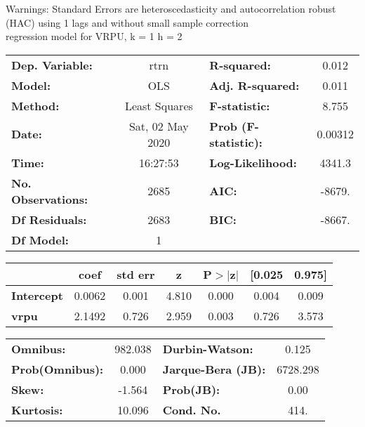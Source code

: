 Warnings: \newline
 [1] Standard Errors are heteroscedasticity and autocorrelation robust (HAC) using 1 lags and without small sample correction\\ 

regression model for VRPU, k = 1 h = 2\begin{center}
\begin{tabular}{lclc}
\toprule
\textbf{Dep. Variable:}    &       rtrn       & \textbf{  R-squared:         } &     0.012   \\
\textbf{Model:}            &       OLS        & \textbf{  Adj. R-squared:    } &     0.011   \\
\textbf{Method:}           &  Least Squares   & \textbf{  F-statistic:       } &     8.755   \\
\textbf{Date:}             & Sat, 02 May 2020 & \textbf{  Prob (F-statistic):} &  0.00312    \\
\textbf{Time:}             &     16:27:53     & \textbf{  Log-Likelihood:    } &    4341.3   \\
\textbf{No. Observations:} &        2685      & \textbf{  AIC:               } &    -8679.   \\
\textbf{Df Residuals:}     &        2683      & \textbf{  BIC:               } &    -8667.   \\
\textbf{Df Model:}         &           1      & \textbf{                     } &             \\
\bottomrule
\end{tabular}
\begin{tabular}{lcccccc}
                   & \textbf{coef} & \textbf{std err} & \textbf{z} & \textbf{P$> |$z$|$} & \textbf{[0.025} & \textbf{0.975]}  \\
\midrule
\textbf{Intercept} &       0.0062  &        0.001     &     4.810  &         0.000        &        0.004    &        0.009     \\
\textbf{vrpu}      &       2.1492  &        0.726     &     2.959  &         0.003        &        0.726    &        3.573     \\
\bottomrule
\end{tabular}
\begin{tabular}{lclc}
\textbf{Omnibus:}       & 982.038 & \textbf{  Durbin-Watson:     } &    0.125  \\
\textbf{Prob(Omnibus):} &   0.000 & \textbf{  Jarque-Bera (JB):  } & 6728.298  \\
\textbf{Skew:}          &  -1.564 & \textbf{  Prob(JB):          } &     0.00  \\
\textbf{Kurtosis:}      &  10.096 & \textbf{  Cond. No.          } &     414.  \\
\bottomrule
\end{tabular}
\end{center}

